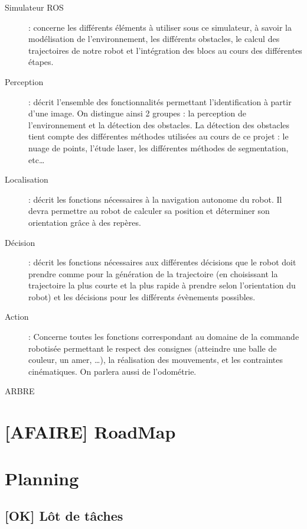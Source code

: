 \documentclass[10pt,a4paper]{article}
\begin{document}
\begin{description}
\item [Simulateur ROS] : concerne les différents éléments à utiliser sous ce simulateur, à savoir la modélisation de l’environnement, les différents obstacles, le calcul des trajectoires de notre robot et l’intégration des blocs au cours des différentes étapes.
\item  [Perception] : décrit l’ensemble des fonctionnalités permettant l’identification à partir d’une image. On distingue ainsi 2 groupes : la perception de l’environnement et la détection des obstacles. La détection des obstacles tient compte des différentes méthodes utilisées au cours de ce projet : le nuage de points, l’étude laser, les différentes méthodes de segmentation, etc…
\item [Localisation] : décrit les fonctions nécessaires à la navigation autonome du robot. Il devra permettre au robot de calculer sa position et déterminer son orientation grâce à des repères.
\item [Décision] : décrit les fonctions nécessaires aux différentes décisions que le robot doit prendre comme pour la génération de la trajectoire (en choisissant la trajectoire la plus courte et la plus rapide à prendre selon l’orientation du robot) et les décisions pour les différents évènements possibles.
\item [Action] : Concerne toutes les fonctions correspondant au domaine de la commande robotisée permettant le respect des consignes (atteindre une balle de couleur, un amer, …), la réalisation des mouvements, et les contraintes cinématiques. On parlera aussi de l’odométrie.
\end{description}

ARBRE %

\section{[AFAIRE] RoadMap}

\section{Planning}
\label{sec:planning}

\subsection{[OK] Lôt de tâches}
\end{document}

